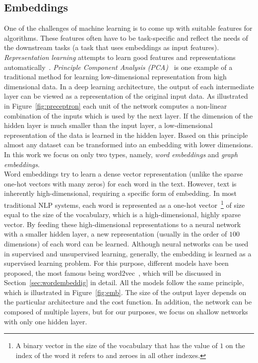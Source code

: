 \subsection{Embeddings}\label{subsec:embeddings}
One of the challenges of machine learning is to come up with suitable features for algorithms. These features often have to be task-specific and reflect the needs of the downstream tasks (a task that uses embeddings as input features). \emph{Representation learning} attempts to learn good features and representations automatically~. \emph{Principle Component Analysis (PCA)}~ is one example of a traditional method for learning low-dimensional representation from high dimensional data. In a deep learning architecture, the output of each intermediate layer can be viewed as a representation of the original input data. As illustrated in Figure~\ref{fig:preceptron} each unit of the network computes a non-linear combination of the inputs which is used by the next layer. If the dimension of the hidden layer is much smaller than the input layer, a low-dimensional representation of the data is learned in the hidden layer. Based on this principle almost any dataset can be transformed into an embedding with lower dimensions. In this work we focus on only two types, namely, \emph{word embeddings} and \emph{graph embeddings}. \\
\noindent
Word embeddings try to learn a dense vector representation (unlike the sparse one-hot vectors with many zeros) for each word in the text.
However, text is inherently high-dimensional, requiring a specific form of embedding.
In most traditional NLP systems, each word is represented as a one-hot vector~\footnote{A binary vector in the size of the vocabulary that has the value of $1$ on the index of the word it refers to and zeroes in all other indexes.} of size equal to the size of the vocabulary, which is a high-dimensional, highly sparse vector.
By feeding these high-dimensional representations to a neural network with a smaller hidden layer, a new representation (usually in the order of $100$ dimensions) of each word can be learned. Although neural networks can be used in supervised and unsupervised learning, generally, the embedding is learned as a supervised learning problem. For this purpose, different models have been proposed, the most famous being word2vec~, which will be discussed in Section~\ref{sec:wordembeddig} in detail. All the models follow the same principle, which is illustrated in Figure~\ref{fig:emb}. The size of the output layer depends on the particular architecture and the cost function. In addition, the network can be composed of multiple layers, but for our purposes, we focus on shallow networks with only one hidden layer. \\

